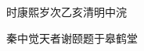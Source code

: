 \documentclass{ltc-guji}
\begin{document}
\begin{正文}

 时康熙岁次乙亥清明中浣

 秦中觉天者谢颐题于皋鹤堂

\end{正文}
\end{document}
